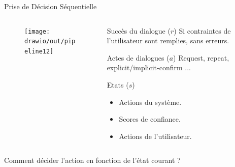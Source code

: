 \documentclass[french]{beamer}
\begin{document}
    \begin{frame}{Prise de Décision Séquentielle}


        \begin{columns}
            \begin{column}{0.5\textwidth}
                \begin{figure}
                    \centering
                    \texttt{[image: drawio/out/pipeline12]}
                \end{figure}
            \end{column}
            \pause
            \begin{column}{0.5\textwidth}  %
                \begin{block}{Succès du dialogue ($r$)}
                    Si contraintes de l'utilisateur sont remplies, sans erreurs.
                \end{block}

                \begin{block}{Actes de dialogues ($a$)}
                    Request, repeat, explicit/implicit-confirm ...
                \end{block}

                \begin{block}{Etats ($s$)}
                    \begin{itemize}
                        \item Actions du système.
                        \item Scores de confiance.
                        \item Actions de l'utilisateur.
                    \end{itemize}
                \end{block}
            \end{column}
        \end{columns}
        \pause
        \begin{alertblock}{}
            Comment décider l'action en fonction de l'état courant ?
        \end{alertblock}

    \end{frame}
\end{document}
